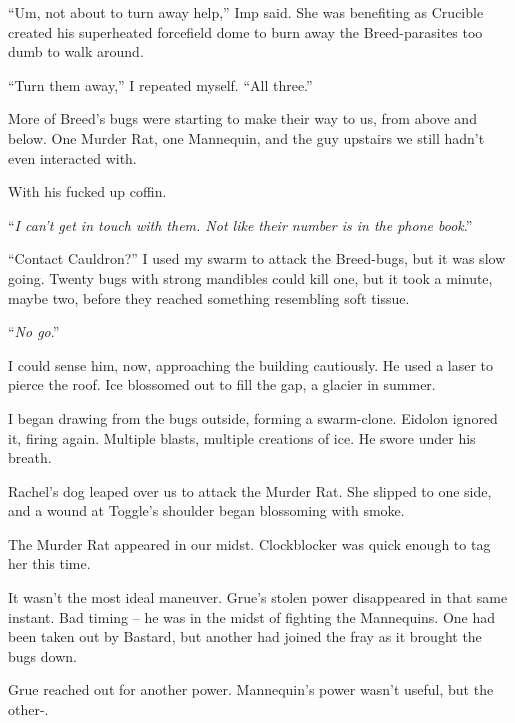 ``Um, not about to turn away help,'' Imp said.  She was benefiting as Crucible created his superheated forcefield dome to burn away the Breed-parasites too dumb to walk around.



``Turn them away,'' I repeated myself.  ``All three.''



More of Breed's bugs were starting to make their way to us, from above and below.  One Murder Rat, one Mannequin, and the guy upstairs we still hadn't even interacted with.



With his fucked up coffin.



``\emph{I can't get in touch with them.  Not like their number is in the phone book}.''



``Contact Cauldron?''  I used my swarm to attack the Breed-bugs, but it was slow going.  Twenty bugs with strong mandibles could kill one, but it took a minute, maybe two, before they reached something resembling soft tissue.



``\emph{No go}.''



I could sense him, now, approaching the building cautiously.  He used a laser to pierce the roof.  Ice blossomed out to fill the gap, a glacier in summer.



I began drawing from the bugs outside, forming a swarm-clone.  Eidolon ignored it, firing again.  Multiple blasts, multiple creations of ice.  He swore under his breath.



Rachel's dog leaped over us to attack the Murder Rat.  She slipped to one side, and a wound at Toggle's shoulder began blossoming with smoke.



The Murder Rat appeared in our midst.  Clockblocker was quick enough to tag her this time.



It wasn't the most ideal maneuver.  Grue's stolen power disappeared in that same instant.  Bad timing – he was in the midst of fighting the Mannequins.  One had been taken out by Bastard, but another had joined the fray as it brought the bugs down.



Grue reached out for another power.  Mannequin's power wasn't useful, but the other-.



